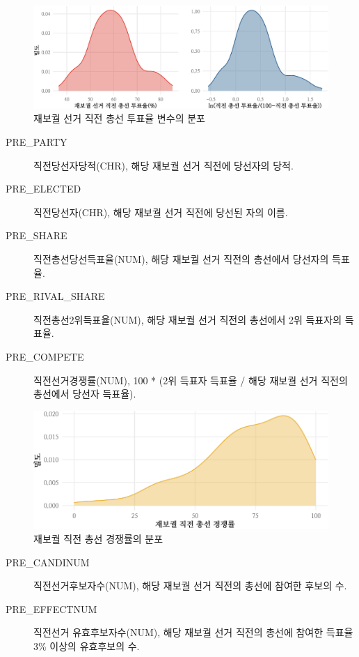 \documentclass[
  11pt,
  letter]{article}
\begin{document}
\begin{figure}
\centering
\includegraphics{Codebook_national_files/figure-latex/unnamed-chunk-13-1.pdf}
\caption{재보궐 선거 직전 총선 투표율 변수의 분포}
\end{figure}

\begin{description}
\item[PRE\_PARTY]
직전당선자당적(CHR), 해당 재보궐 선거 직전에 당선자의 당적.
\item[PRE\_ELECTED]
직전당선자(CHR), 해당 재보궐 선거 직전에 당선된 자의 이름.
\item[PRE\_SHARE]
직전총선당선득표율(NUM), 해당 재보궐 선거 직전의 총선에서 당선자의
득표율.
\item[PRE\_RIVAL\_SHARE]
직전총선2위득표율(NUM), 해당 재보궐 선거 직전의 총선에서 2위 득표자의
득표율.
\item[PRE\_COMPETE]
직전선거경쟁률(NUM), 100 * (2위 득표자 득표율 / 해당 재보궐 선거 직전의
총선에서 당선자 득표율).
\end{description}

\begin{figure}
\centering
\includegraphics{Codebook_national_files/figure-latex/unnamed-chunk-14-1.pdf}
\caption{재보궐 직전 총선 경쟁률의 분포}
\end{figure}

\begin{description}
\item[PRE\_CANDINUM]
직전선거후보자수(NUM), 해당 재보궐 선거 직전의 총선에 참여한 후보의 수.
\item[PRE\_EFFECTNUM]
직전선거 유효후보자수(NUM), 해당 재보궐 선거 직전의 총선에 참여한 득표율
3\% 이상의 유효후보의 수.
\end{description}
\end{document}

